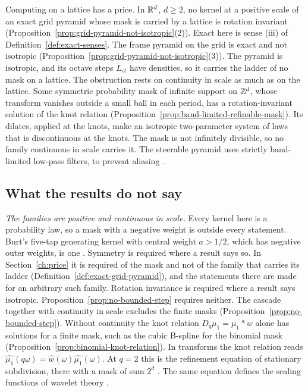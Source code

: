 Computing on a lattice has a price. In $\mathbb{R}^d$, $d \ge 2$, no kernel at a positive scale of an
exact grid pyramid whose mask is carried by a lattice is rotation invariant
(Proposition~\ref{prop:grid-pyramid-not-isotropic}(2)). Exact here is sense (iii) of
Definition~\ref{def:exact-senses}. The frame \Matern{} pyramid on the grid is exact and not
isotropic (Proposition~\ref{prop:grid-pyramid-not-isotropic}(3)). The \Matern{} pyramid is
isotropic, and its octave steps $L_{ct}$ have densities, so it carries the ladder of no mask on a
lattice. The obstruction rests on continuity in scale as much as on the lattice. Some symmetric
probability mask of infinite support on $\mathbb{Z}^d$, whose transform vanishes outside a small ball in
each period, has a rotation-invariant solution of the knot relation
(Proposition~\ref{prop:band-limited-refinable-mask}). Its dilates, applied at the knots, make an
isotropic two-parameter system of laws that is discontinuous at the knots. The mask is not
infinitely divisible, so no family continuous in scale carries it. The steerable pyramid uses
strictly band-limited low-pass filters, to prevent aliasing \cite[p.~445]{simoncelli1995steerable}.

\subsection{What the results do not say}

\emph{The families are positive and continuous in scale.} Every kernel here is a
probability law, so a mask with a negative weight is outside every statement. Burt's five-tap
generating kernel with central weight $a > 1/2$, which has negative outer weights, is one
\cite[pp.~533--534]{burt1983laplacian}. Symmetry is required where a result says so. In
Section~\ref{ch:price} it is required of the mask and not of the family that carries its ladder
(Definition~\ref{def:exact-grid-pyramid}), and the statements there are made for an arbitrary such
family.
Rotation invariance is required where a result says isotropic.
Proposition~\ref{prop:no-bounded-step} requires neither. The cascade together with continuity in
scale excludes the finite masks (Proposition~\ref{prop:no-bounded-step}). Without continuity the knot relation $D_q\mu_1 = \mu_1 * w$ alone
has solutions for a finite mask, such as the cubic B-spline for the binomial mask
(Proposition~\ref{prop:binomial-knot-relation}). In transforms the knot relation reads
$\widehat{\mu_1}(q\omega) = \widehat{w}(\omega)\widehat{\mu_1}(\omega)$. At $q = 2$ this is the
refinement equation of stationary subdivision, there with a mask of sum $2^d$
\cite[Ch.~6, p.~107]{cavaretta1991stationary}. The same equation defines the scaling functions of
wavelet theory \cite[p.~5]{cavaretta1991stationary}.

